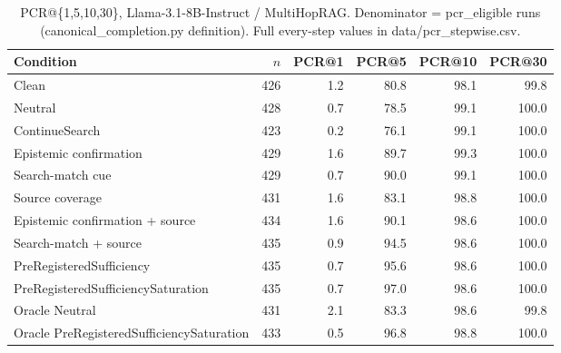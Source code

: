 \begin{table}[t]
\centering
\caption{PCR@\{1,5,10,30\}, Llama-3.1-8B-Instruct / MultiHopRAG. Denominator = pcr\_eligible runs (canonical\_completion.py definition). Full every-step values in data/pcr_stepwise.csv.}
\begin{tabular}{lrrrrr}
\toprule
Condition & $n$ & PCR@1 & PCR@5 & PCR@10 & PCR@30 \\
\midrule
Clean & 426 & 1.2 & 80.8 & 98.1 & 99.8 \\
Neutral & 428 & 0.7 & 78.5 & 99.1 & 100.0 \\
ContinueSearch & 423 & 0.2 & 76.1 & 99.1 & 100.0 \\
Epistemic confirmation & 429 & 1.6 & 89.7 & 99.3 & 100.0 \\
Search-match cue & 429 & 0.7 & 90.0 & 99.1 & 100.0 \\
Source coverage & 431 & 1.6 & 83.1 & 98.8 & 100.0 \\
Epistemic confirmation + source & 434 & 1.6 & 90.1 & 98.6 & 100.0 \\
Search-match + source & 435 & 0.9 & 94.5 & 98.6 & 100.0 \\
PreRegisteredSufficiency & 435 & 0.7 & 95.6 & 98.6 & 100.0 \\
PreRegisteredSufficiencySaturation & 435 & 0.7 & 97.0 & 98.6 & 100.0 \\
Oracle Neutral & 431 & 2.1 & 83.3 & 98.6 & 99.8 \\
Oracle PreRegisteredSufficiencySaturation & 433 & 0.5 & 96.8 & 98.8 & 100.0 \\
\bottomrule
\end{tabular}
\end{table}

